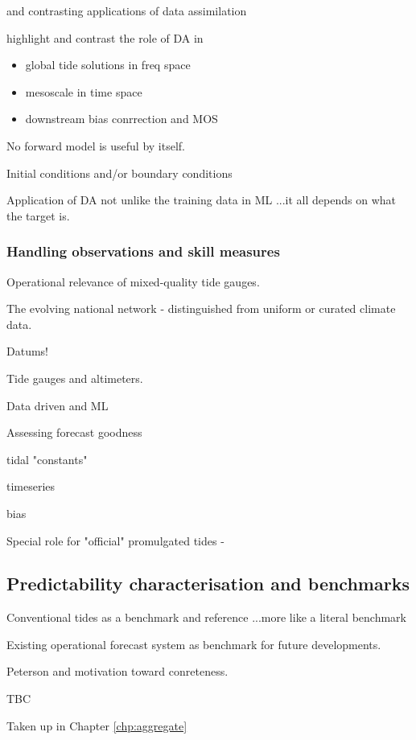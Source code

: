 and contrasting applications of data assimilation

highlight and contrast the role of DA in 
\begin{itemize}
    \item global tide solutions in freq space
    \item mesoscale in time space
    \item downstream bias conrrection and MOS
\end{itemize}

No forward model is useful by itself.

Initial conditions and/or boundary conditions 

Application of DA not unlike the training data in ML ...it all depends on what the target is.

\subsubsection{Handling observations and skill measures}
Operational relevance of mixed-quality tide gauges.

The evolving national network - distinguished from uniform or curated climate data.


Datums!

Tide gauges and altimeters.    


Data driven and ML


Assessing forecast goodness

tidal "constants"

timeseries

bias

Special role for "official" promulgated tides -

\subsection{Predictability characterisation and benchmarks}

Conventional tides as a benchmark and reference ...more like a literal benchmark


Existing operational forecast system as benchmark for future developments.


Peterson and motivation toward conreteness.


TBC

Taken up in Chapter \ref{chp:aggregate}




